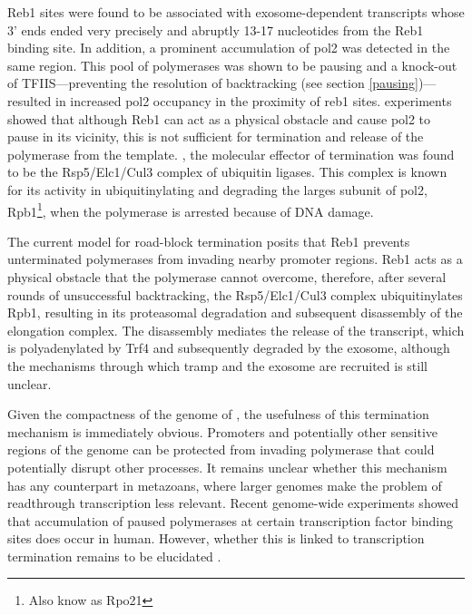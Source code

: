 Reb1 sites were found to be associated with exosome-dependent transcripts whose 3' ends ended very precisely and abruptly 13-17 nucleotides from the Reb1 binding site. 
In addition, a prominent accumulation of \gls{pol2} was detected in the same region.
This pool of polymerases was shown to be pausing and a knock-out of TFIIS---preventing the resolution of backtracking (see section \ref{pausing})---resulted in increased \gls{pol2} occupancy in the proximity of reb1 sites.
\Invitro{} experiments showed that although Reb1 can act as a physical obstacle and cause \gls{pol2} to pause in its vicinity, this is not sufficient for termination and release of the polymerase from the template.
\Invivo{}, the molecular effector of termination was found to be the Rsp5/Elc1/Cul3 complex of ubiquitin ligases.
This complex is known for its activity in ubiquitinylating and degrading the larges subunit of \gls{pol2}, Rpb1\footnote{Also know as Rpo21}, when the polymerase is arrested because of DNA damage.

The current model for road-block termination posits that Reb1 prevents unterminated polymerases from invading nearby promoter regions. 
Reb1 acts as a physical obstacle that the polymerase cannot overcome, therefore, after several rounds of unsuccessful backtracking, the Rsp5/Elc1/Cul3 complex ubiquitinylates Rpb1, resulting in its proteasomal degradation and subsequent disassembly of the elongation complex.
The disassembly mediates the release of the transcript, which is polyadenylated by Trf4 and subsequently degraded by the exosome, although the mechanisms through which \gls{tramp} and the exosome are recruited is still unclear.

Given the compactness of the genome of \cer{}, the usefulness of this termination mechanism is immediately obvious. 
Promoters and potentially other sensitive regions of the genome can be protected from invading polymerase that could potentially disrupt other processes.
It remains unclear whether this mechanism has any counterpart in metazoans, where larger genomes make the problem of readthrough transcription less relevant.
Recent genome-wide experiments showed that accumulation of paused polymerases at certain transcription factor binding sites does occur in human.
However, whether this is linked to transcription termination remains to be elucidated \cite{mayer:2015:native}.

\clearpage